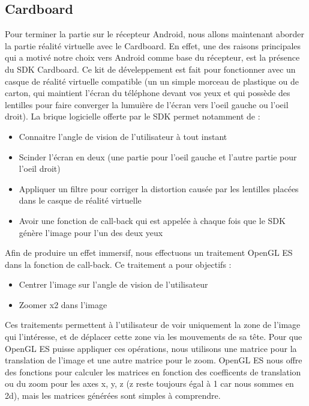 \documentclass[11pt,a4paper]{article}
\begin{document}
\subsection{Cardboard}
Pour terminer la partie sur le récepteur Android, nous allons maintenant aborder la partie réalité virtuelle avec le Cardboard.
En effet, une des raisons principales qui a motivé notre choix vers Android comme base du récepteur, est la présence du SDK Cardboard.
Ce kit de déveleppement est fait pour fonctionner avec un casque de réalité virtuelle compatible (un un simple morceau de plastique ou de carton, qui maintient l'écran du téléphone devant vos yeux et qui possède des lentilles pour faire converger la lumuière de l'écran vers l'oeil gauche ou l'oeil droit).
La brique logicielle offerte par le SDK permet notamment de :

\bigbreak
\begin{itemize}
\item{Connaitre l'angle de vision de l'utilisateur à tout instant}
\item{Scinder l'écran en deux (une partie pour l'oeil gauche et l'autre partie pour l'oeil droit)}
\item{Appliquer un filtre pour corriger la distortion causée par les lentilles placées dans le casque de réalité virtuelle}
\item{Avoir une fonction de call-back qui est appelée à chaque fois que le SDK génère l'image pour l'un des deux yeux}
\end{itemize}

\bigbreak
Afin de produire un effet immersif, nous effectuons un traitement OpenGL ES dans la fonction de call-back.
Ce traitement a pour objectifs :

\bigbreak
\begin{itemize}
\item{Centrer l'image sur l'angle de vision de l'utilisateur}
\item{Zoomer x2 dans l'image}
\end{itemize}

\bigbreak
Ces traitements permettent à l'utilisateur de voir uniquement la zone de l'image qui l'intéresse, et de déplacer cette zone via les mouvements de sa tête.
Pour que OpenGL ES puisse appliquer ces opérations, nous utilisons une matrice pour la translation de l'image et une autre matrice pour le zoom.
OpenGL ES nous offre des fonctions pour calculer les matrices en fonction des coefficents de translation ou du zoom pour les axes x, y, z (z reste toujours égal à 1 car nous sommes en 2d), mais les matrices générées sont simples à comprendre.
\end{document}
